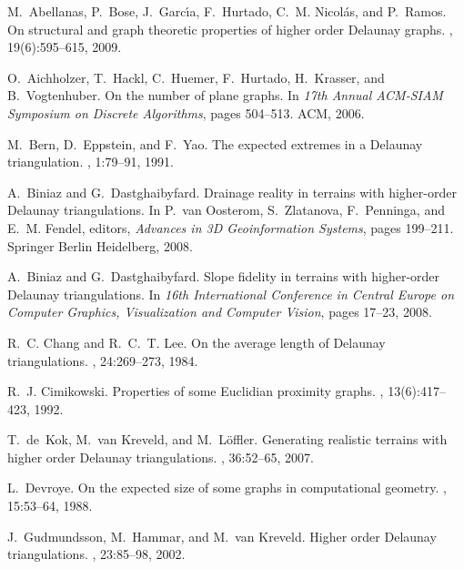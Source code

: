 \documentclass {journal}
\begin{document}
\begin{thebibliography}{99}

M.~Abellanas, P.~Bose, J.~Garc\'{\i}a, F.~Hurtado, C.~M.
Nicol\'as, and
  P.~Ramos.
\newblock On structural and graph theoretic properties of higher order
  {D}elaunay graphs.
, 19(6):595--615, 2009.

O.~Aichholzer, T.~Hackl, C.~Huemer, F.~Hurtado, H.~Krasser, and
B.~Vogtenhuber.
\newblock On the number of plane graphs.
\newblock In {\em 17th Annual ACM-SIAM Symposium on Discrete Algorithms}, pages
  504--513. ACM, 2006.

M.~Bern, D.~Eppstein, and F.~Yao.
\newblock The expected extremes in a {Delaunay} triangulation.
, 1:79--91, 1991.

A.~Biniaz and G.~Dastghaibyfard.
\newblock Drainage reality in terrains with higher-order {D}elaunay
  triangulations.
\newblock In P.~van Oosterom, S.~Zlatanova, F.~Penninga, and E.~M. Fendel,
  editors, {\em Advances in 3D Geoinformation Systems}, pages 199--211.
  Springer Berlin Heidelberg, 2008.

A.~Biniaz and G.~Dastghaibyfard.
\newblock Slope fidelity in terrains with higher-order {D}elaunay
  triangulations.
\newblock In {\em 16th International Conference in Central Europe on Computer
  Graphics, Visualization and Computer Vision}, pages 17--23, 2008.

R.~C. Chang and R.~C.~T. Lee.
\newblock On the average length of {Delaunay} triangulations.
, 24:269--273, 1984.

R.~J. Cimikowski.
\newblock Properties of some {Euclidian} proximity graphs.
, 13(6):417--423, 1992.

T.~de~Kok, M.~van Kreveld, and M.~L{\"o}ffler.
\newblock Generating realistic terrains with higher order {D}elaunay
  triangulations.
, 36:52--65, 2007.

L.~Devroye.
\newblock On the expected size of some graphs in computational geometry.
, 15:53--64, 1988.

J.~Gudmundsson, M.~Hammar, and M.~van Kreveld.
\newblock Higher order {D}elaunay triangulations.
, 23:85--98, 2002.


\end{thebibliography}
\end{document}

